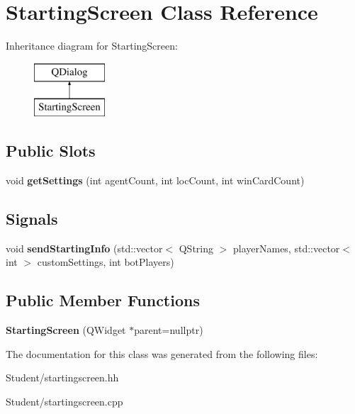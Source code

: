 \hypertarget{class_starting_screen}{\section{Starting\-Screen Class Reference}
\label{class_starting_screen}
}
Inheritance diagram for Starting\-Screen\-:\begin{figure}[H]
\begin{center}
\leavevmode
\includegraphics[height=2.000000cm]{class_starting_screen}
\end{center}
\end{figure}
\subsection*{Public Slots}
\begin{DoxyCompactItemize}
\item 
\hypertarget{class_starting_screen_a99c491367c9621ffaafec8580de7777c}{void {\bfseries get\-Settings} (int agent\-Count, int loc\-Count, int win\-Card\-Count)}\label{class_starting_screen_a99c491367c9621ffaafec8580de7777c}

\end{DoxyCompactItemize}
\subsection*{Signals}
\begin{DoxyCompactItemize}
\item 
\hypertarget{class_starting_screen_add35931538aa695bd85778f609ee3c53}{void {\bfseries send\-Starting\-Info} (std\-::vector$<$ Q\-String $>$ player\-Names, std\-::vector$<$ int $>$ custom\-Settings, int bot\-Players)}\label{class_starting_screen_add35931538aa695bd85778f609ee3c53}

\end{DoxyCompactItemize}
\subsection*{Public Member Functions}
\begin{DoxyCompactItemize}
\item 
\hypertarget{class_starting_screen_a271b7feb0bf62aa66f2564c8c7b77864}{{\bfseries Starting\-Screen} (Q\-Widget $\ast$parent=nullptr)}\label{class_starting_screen_a271b7feb0bf62aa66f2564c8c7b77864}

\end{DoxyCompactItemize}


The documentation for this class was generated from the following files\-:\begin{DoxyCompactItemize}
\item 
Student/startingscreen.\-hh\item 
Student/startingscreen.\-cpp\end{DoxyCompactItemize}
